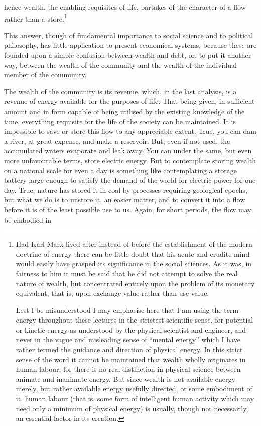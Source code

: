 \documentclass[10.5pt,twoside]{book}
\newcommand{\origpage}[1]{\clearpage\setcounter{page}{#1}}
\begin{document}
\origpage{13}

\noindent hence wealth, the enabling requisites of life, partakes of the
character of a flow rather than a store.\footnote{Had Karl Marx lived after
instead of before the establishment of the modern doctrine of energy there can
be little doubt that his acute and erudite mind would easily have grasped its
significance in the social sciences. As it was, in fairness to him it must be
said that he did not attempt to solve the real nature of wealth, but
concentrated entirely upon the problem of its monetary equivalent, that is,
upon exchange-value rather than use-value.\par\medskip
Lest I be misunderstood I may emphasise here that I am using the term energy
throughout these lectures in the strictest scientific sense, for potential or
kinetic energy as understood by the physical scientist and engineer, and never
in the vague and misleading sense of ``mental energy'' which I have rather
termed the guidance and direction of physical energy. In this strict sense of
the word it cannot be maintained that wealth wholly originates in human
labour, for there is no real distinction in physical science between animate
and inanimate energy. But since wealth is not available energy merely, but
rather available energy usefully directed, or some embodiment of it, human
labour (that is, some form of intelligent human activity which may need only a
minimum of physical energy) is usually, though not necessarily, an essential
factor in its creation.}

This answer, though of fundamental importance to social science and to
political philosophy, has little application to present economical systems,
because these are founded upon a simple confusion between wealth and debt, or,
to put it another way, between the wealth of the community and the wealth of
the individual member of the community.

The wealth of the community is its revenue, which, in the last analysis, is a
revenue of energy available for the purposes of life. That being given, in
sufficient amount and in form capable of being utilised by the existing
knowledge of the time, everything requisite for the life of the society can be
maintained. It is impossible to save or store this flow to any appreciable
extent. True, you can dam a river, at great expense, and make a reservoir.
But, even if not used, the accumulated waters evaporate and leak away. You can
under the same, but even more unfavourable terms, store electric energy. But
to contemplate storing wealth on a national scale for even a day is something
like contemplating a storage battery large enough to satisfy the demand of the
world for electric power for one day. True, nature has stored it in coal by
processes requiring geological epochs, but what we do is to unstore it, an
easier matter, and to convert it into a flow before it is of the least
possible use to us. Again, for short periods, the flow may be embodied in
\end{document}
